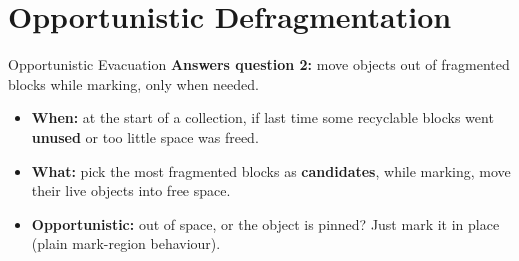 \documentclass[aspectratio=169]{beamer}
\begin{document}
\section{Opportunistic Defragmentation}

\begin{frame}{Opportunistic Evacuation}
	\textcolor{themeExample}{\textbf{Answers question 2:}} move objects out of fragmented blocks while marking, only when needed.

	\begin{itemize}
		\item \textbf{When:} at the start of a collection, if last time some recyclable blocks went \textbf{unused} or too little space was freed.
		\item \textbf{What:} pick the most fragmented blocks as \textbf{candidates}, while marking, move their live objects into free space.
		\item \textbf{Opportunistic:} out of space, or the object is pinned? Just mark it in place (plain mark-region behaviour).
	\end{itemize}
\end{frame}
\end{document}
